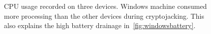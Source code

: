 \documentclass[acmlarge]{acmart}
\begin{document}
\begin{figure}[]
\centering
\vspace{-3mm}
\caption{CPU usage recorded on three devices. Windows machine consumed more processing than the other devices during cryptojacking. This also explains the high battery drainage in~\autoref{fig:windowsbattery}. }
\vspace{-3mm}
\label{expriment:cpu}
\end{figure}
\end{document}
